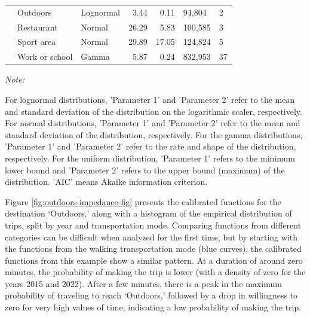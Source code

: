\documentclass[preprint, 3p,
authoryear]{elsarticle} %
\begin{document}
\begin{table}
{\begin{threeparttable}
\begin{tabular}[t]{rllrrll}
 & Outdoors & Lognormal & 3.44 & 0.11 & 94,804 & 2\\

 & Restaurant & Normal & 26.29 & 5.83 & 100,585 & 3\\

 & Sport area & Normal & 29.89 & 17.05 & 124,824 & 5\\

\multirow[t]{-7}{*}{\raggedleft\arraybackslash 2022} & Work or school & Gamma & 5.87 & 0.24 & 832,953 & 37\\
\bottomrule
\end{tabular}
\begin{tablenotes}
\item \textit{Note: } 
\item For lognormal distributions, 'Parameter 1' and 'Parameter 2' refer to the mean and standard deviation of the distribution on the logarithmic scaler, respectively. For normal distributions, 'Parameter 1' and 'Parameter 2' refer to the mean and standard deviation of the distribution, respectively. For the gamma distributions, 'Parameter 1' and 'Parameter 2' refer to the rate and shape of the distribution, respectively. For the uniform distribution,  'Parameter 1' refers to the minimum lower bound and 'Parameter 2'  refers to the upper bound (maximum) of the distribution.  'AIC' means Akaike information criterion.
\end{tablenotes}
\end{threeparttable}}
\end{table}

Figure \ref{fig:outdoors-impedance-fig} presents the calibrated
functions for the destination `Outdoors,' along with a histogram of the
empirical distribution of trips, split by year and transportation mode.
Comparing functions from different categories can be difficult when
analyzed for the first time, but by starting with the functions from the
walking transportation mode (blue curves), the calibrated functions from
this example show a similar pattern. At a duration of around zero
minutes, the probability of making the trip is lower (with a density of
zero for the years 2015 and 2022). After a few minutes, there is a peak
in the maximum probability of traveling to reach `Outdoors,' followed by
a drop in willingness to zero for very high values of time, indicating a
low probability of making the trip.
\end{document}
